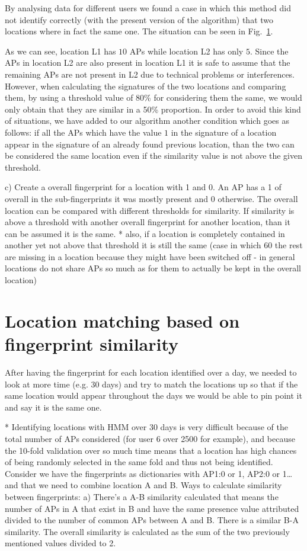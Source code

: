 
By analysing data for different users we found a case in which this method did
not identify correctly (with the present version of the algorithm) that two
locations where in fact the same one. The situation can be seen in Fig.~\ref{}.

As we can see, location L1 has $10$ APs while location L2 has only $5$. Since
the APs in location L2 are also present in location L1 it is safe to assume that
the remaining APs are not present in L2 due to technical problems or
interferences. However, when calculating the signatures of the two locations and
comparing them, by using a threshold value of 80\% for considering them the
same, we would only obtain that they are similar in a 50\% proportion. In order
to avoid this kind of situations, we have added to our algorithm another
condition which goes as follows: if all the APs which have the value $1$ in the
signature of a location appear in the signature of an already found previous
location, than the two can be considered the same location even if the
similarity value is not above the given threshold.


c) Create a overall fingerprint for a location with 1 and 0.
An AP has a 1 of overall in the sub-fingerprints it was mostly present and 0 otherwise. The
overall location can be compared with different thresholds for similarity. If
similarity is above a threshold with another overall fingerprint for another
location, than it can be assumed it is the same.
* also, if a location is completely contained in another yet not above that
threshold it is still the same (case in which 60%
the rest are missing in a location because they might have been switched off -
in general locations do not share APs so much as for them to actually be kept in
the overall location)

\section{Location matching based on fingerprint similarity}
After having the fingerprint for each location identified over a day, we needed to look at more time (e.g. 30 days) and try to match the locations up so that if the same location would appear throughout the days we would be able to pin point it and say it is the same one.

* Identifying locations with HMM over 30 days is very difficult because of the total number of APs considered (for user 6 over 2500 for example), and because the 10-fold validation over so much time means that a location has high chances of being randomly selected in the same fold and thus not being identified.
Consider we have the fingerprints as dictionaries with {AP1:0 or 1, AP2:0 or 1…} and that we need to combine location A and B.
Ways to calculate similarity between fingerprints:
a) There's a A-B similarity calculated that means the number of APs in A that exist in B and have the same presence value attributed divided to the number of common APs between A and B. There is a similar B-A similarity. The overall similarity is calculated as the sum of the two previously mentioned values divided to 2.


